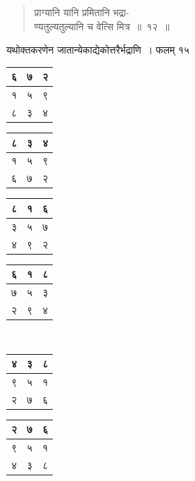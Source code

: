 \documentclass[11pt, openany]{book}
\begin{document}
\begin{quote}
{\ex प्राग्यानि यानि प्रमितानि भद्रा-\\
 ण्यतुल्यतुल्यानि च वेत्सि मित्र~॥~१२~॥}
 \end{quote}

यथोक्तकरणेन जातान्येकाद्येकोत्तरैर्भद्राणि~। फलम् १५

\begin{table}[h]
\centering
\begin{tabular}{|c|c|c|}
	\hline
	६ & ७ & २\\
	\hline
	१ & ५ & ९\\
	\hline
	८& ३ & ४\\
	\hline
\end{tabular}
\hspace{2mm}
\begin{tabular}{|c|c|c|}
	\hline
	८ & ३ & ४\\
	\hline
	१ & ५ & ९\\
	\hline
	६& ७ & २\\
	\hline
\end{tabular}
\hspace{2mm}
\begin{tabular}{|c|c|c|}
	\hline
	८ & १ & ६\\
	\hline
	३ & ५ & ७\\
	\hline
	४ & ९ & २\\
	\hline
\end{tabular}
\hspace{2mm}
\begin{tabular}{|c|c|c|}
	\hline
	६ & १ & ८\\
	\hline
	७ & ५ & ३\\
	\hline
	२ & ९ & ४\\
	\hline
\end{tabular}\\
\vspace{0.4cm}
\begin{tabular}{|c|c|c|}
	\hline
	४ & ३ & ८\\
	\hline
	९ & ५ & १\\
	\hline
	२ & ७ & ६\\
	\hline
\end{tabular}
\hspace{2mm}
\begin{tabular}{|c|c|c|}
	\hline
	२ & ७ & ६\\
	\hline
	९ & ५ & १\\
	\hline
	४ & ३ & ८\\
	\hline
\end{tabular}
\hspace{2mm}

\end{table}
\end{document}
